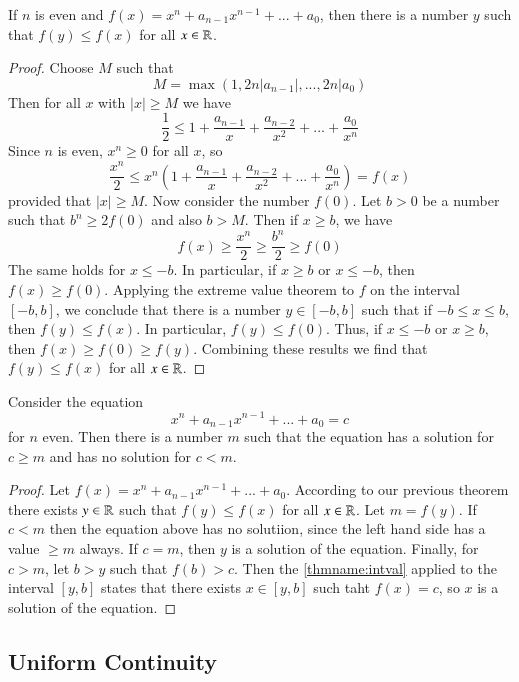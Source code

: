 \documentclass[12pt, a4paper, oneside, openright, titlepage]{book}
\begin{document}
\begin{thm}
    If $n$ is even and $f(x) = x^n+a_{n-1}x^{n-1} + ... + a_0$, then there is a number $y$ such that $f(y) \leq f(x)$ for all $x \in \mathbb R$.
\end{thm}
\begin{proof}
    Choose $M$ such that $$M = \max(1,2n|a_{n-1}|,...,2n|a_0)$$
    Then for all $x$ with $|x| \geq M$ we have $$\frac{1}{2} \leq 1 + \frac{a_{n-1}}{x} + \frac{a_{n-2}}{x^2} + ... + \frac{a_0}{x^n}$$
    Since $n$ is even, $x^n \geq 0$ for all $x$, so $$\frac{x^n}{2} \leq x^n\left(1 + \frac{a_{n-1}}{x} + \frac{a_{n-2}}{x^2} + ... + \frac{a_0}{x^n}\right) = f(x)$$
    provided that $|x| \geq M$. Now consider the number $f(0)$. Let $b > 0$ be a number such that $b^n \geq 2f(0)$ and also $b > M$. Then if $x \geq b$, we have $$f(x) \geq \frac{x^n}{2} \geq \frac{b^n}{2} \geq f(0)$$
    The same holds for $x \leq -b$. In particular, if $x \geq b$ or $x \leq -b$, then $f(x) \geq f(0)$. Applying the extreme value theorem to $f$ on the interval $[-b,b]$, we conclude that there is a number $y \in [-b,b]$ such that if $-b \leq x \leq b$, then $f(y) \leq f(x)$. In particular, $f(y) \leq f(0)$. Thus, if $x \leq -b$ or $x \geq b$, then $f(x) \geq f(0) \geq f(y)$. Combining these results we find that $f(y) \leq f(x)$ for all $x \in \mathbb R$.
\end{proof}


\begin{cor}
    Consider the equation \begin{equation}
        x^n +a_{n-1}x^{n-1} + ... + a_0 = c
    \end{equation}
    for $n$ even. Then there is a number $m$ such that the equation has a solution for $c \geq m$ and has no solution for $c < m$.
\end{cor}
\begin{proof}
    Let $f(x) = x^n + a_{n-1}x^{n-1} + ...+ a_0$. According to our previous theorem there exists $y \in \mathbb R$ such that $f(y) \leq f(x)$ for all $x \in \mathbb R$. Let $m = f(y)$. If $c < m$ then the equation above has no solutiion, since the left hand side has a value $\geq m$ always. If $c = m$, then $y$ is a solution of the equation. Finally, for $c > m$, let $b > y$ such that $f(b) > c$. Then the \ref{thmname:intval} applied to the interval $[y,b]$ states that there exists $x \in [y,b]$ such taht $f(x) = c$, so $x$ is a solution of the equation.
\end{proof}


\subsection{Uniform Continuity}
\end{document}
